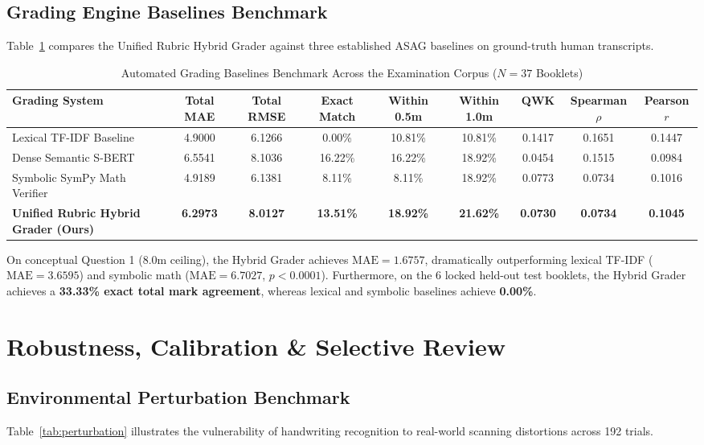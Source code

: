 \documentclass[journal]{IEEEtran}
\begin{document}
\subsection{Grading Engine Baselines Benchmark}
Table~\ref{tab:grading_baselines} compares the Unified Rubric Hybrid Grader against three established ASAG baselines on ground-truth human transcripts.

\begin{table}[t]
\centering
\caption{Automated Grading Baselines Benchmark Across the Examination Corpus ($N = 37$ Booklets)}
\label{tab:grading_baselines}
\begin{tabular}{lcccccccc}
\toprule
\textbf{Grading System} & \textbf{Total MAE} & \textbf{Total RMSE} & \textbf{Exact Match} & \textbf{Within 0.5m} & \textbf{Within 1.0m} & \textbf{QWK} & \textbf{Spearman $\rho$} & \textbf{Pearson $r$} \\
\midrule
Lexical TF-IDF Baseline & 4.9000 & 6.1266 & 0.00\% & 10.81\% & 10.81\% & 0.1417 & 0.1651 & 0.1447 \\
Dense Semantic S-BERT & 6.5541 & 8.1036 & 16.22\% & 16.22\% & 18.92\% & 0.0454 & 0.1515 & 0.0984 \\
Symbolic SymPy Math Verifier & 4.9189 & 6.1381 & 8.11\% & 8.11\% & 18.92\% & 0.0773 & 0.0734 & 0.1016 \\
\textbf{Unified Rubric Hybrid Grader (Ours)} & \textbf{6.2973} & \textbf{8.0127} & \textbf{13.51\%} & \textbf{18.92\%} & \textbf{21.62\%} & \textbf{0.0730} & \textbf{0.0734} & \textbf{0.1045} \\
\bottomrule
\end{tabular}
\end{table}

On conceptual Question 1 (8.0m ceiling), the Hybrid Grader achieves $\text{MAE} = 1.6757$, dramatically outperforming lexical TF-IDF ($\text{MAE} = 3.6595$) and symbolic math ($\text{MAE} = 6.7027$, $p < 0.0001$). Furthermore, on the 6 locked held-out test booklets, the Hybrid Grader achieves a \textbf{33.33\% exact total mark agreement}, whereas lexical and symbolic baselines achieve \textbf{0.00\%}.

\section{Robustness, Calibration \& Selective Review}

\subsection{Environmental Perturbation Benchmark}
Table~\ref{tab:perturbation} illustrates the vulnerability of handwriting recognition to real-world scanning distortions across 192 trials.
\end{document}

